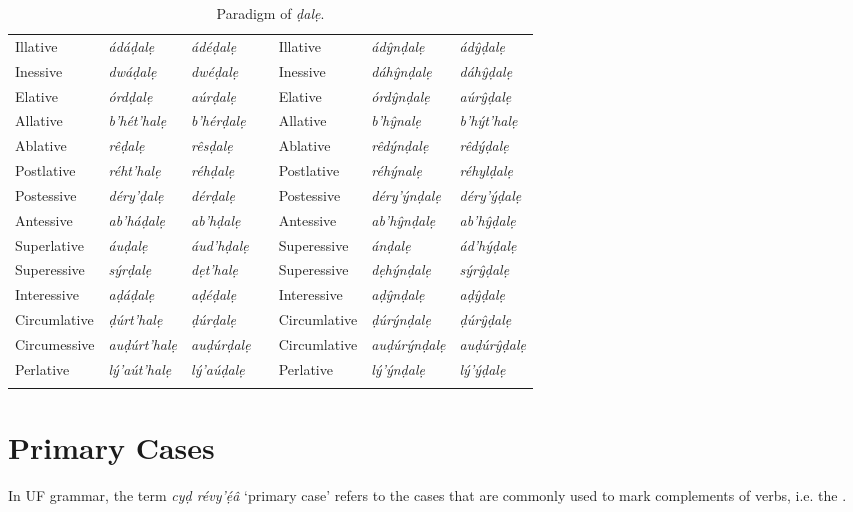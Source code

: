 \documentclass[a4paper, 12pt, twoside, openright, final]{book}
\let \w \textit
\begin{document}
\begin{longtable}{l|>{\it}l|>{\it}lll|>{\it}l|>{\it}l}
Illative      & ádáḍalẹ      & ádéḍalẹ    && Illative      & ádŷnḍalẹ        & ádŷḍalẹ     \\
Inessive      & dwáḍalẹ      & dwéḍalẹ    && Inessive      & dáhŷnḍalẹ       & dáhŷḍalẹ    \\
Elative       & órdḍalẹ      & aúrḍalẹ    && Elative       & órdŷnḍalẹ       & aúrŷḍalẹ    \\
Allative      & b’hét’halẹ   & b’hérḍalẹ  && Allative      & b’hŷnalẹ        & b’hýt’halẹ  \\
Ablative      & rêḍalẹ       & rêsḍalẹ    && Ablative      & rêdýnḍalẹ       & rêdýḍalẹ    \\
Postlative    & réht’halẹ    & réhḍalẹ    && Postlative    & réhýnalẹ        & réhylḍalẹ   \\
Postessive    & déry’ḍalẹ    & dérḍalẹ    && Postessive    & déry’ýnḍalẹ     & déry’ýḍalẹ  \\
Antessive     & ab’háḍalẹ    & ab’hḍalẹ   && Antessive     & ab’hŷnḍalẹ      & ab’hŷḍalẹ   \\
Superlative   & áuḍalẹ       & áud’hḍalẹ  && Superessive   & ánḍalẹ          & ád’hýḍalẹ   \\
Superessive   & sýrḍalẹ      & dẹt’halẹ   && Superessive   & dẹhýnḍalẹ       & sýrŷḍalẹ    \\
Interessive   & aḍáḍalẹ      & aḍéḍalẹ    && Interessive   & aḍŷnḍalẹ        & aḍŷḍalẹ     \\
Circumlative  & ḍúrt’halẹ    & ḍúrḍalẹ    && Circumlative  & ḍúrýnḍalẹ       & ḍúrŷḍalẹ    \\
Circumessive  & auḍúrt’halẹ  & auḍúrḍalẹ  && Circumlative  & auḍúrýnḍalẹ     & auḍúrŷḍalẹ  \\
Perlative     & lý’aút’halẹ  & lý’aúḍalẹ  && Perlative     & lý’ýnḍalẹ       & lý’ýḍalẹ    \\
\noalign{\medskip}
\caption{Paradigm of \w{ḍalẹ}.}\label{tab:vocalic-declension}
\end{longtable}



\section{Primary Cases}
In UF grammar, the term \w{cyḍ révy’ẹ́â} ‘primary case’ refers to the cases that are commonly used to mark complements
of verbs, i.e. the .
\end{document}
